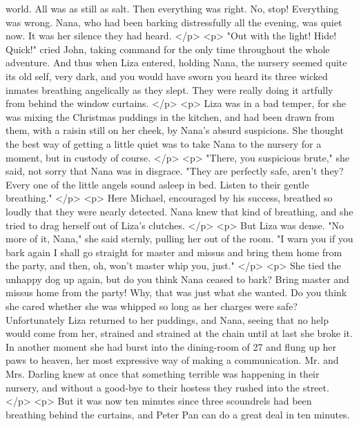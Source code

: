       world. All was as still as salt. Then everything was right. No, stop!
      Everything was wrong. Nana, who had been barking distressfully all the
      evening, was quiet now. It was her silence they had heard.
    </p>
    <p>
      "Out with the light! Hide! Quick!" cried John, taking command for the only
      time throughout the whole adventure. And thus when Liza entered, holding
      Nana, the nursery seemed quite its old self, very dark, and you would have
      sworn you heard its three wicked inmates breathing angelically as they
      slept. They were really doing it artfully from behind the window curtains.
    </p>
    <p>
      Liza was in a bad temper, for she was mixing the Christmas puddings in the
      kitchen, and had been drawn from them, with a raisin still on her cheek,
      by Nana's absurd suspicions. She thought the best way of getting a little
      quiet was to take Nana to the nursery for a moment, but in custody of
      course.
    </p>
    <p>
      "There, you suspicious brute," she said, not sorry that Nana was in
      disgrace. "They are perfectly safe, aren't they? Every one of the little
      angels sound asleep in bed. Listen to their gentle breathing."
    </p>
    <p>
      Here Michael, encouraged by his success, breathed so loudly that they were
      nearly detected. Nana knew that kind of breathing, and she tried to drag
      herself out of Liza's clutches.
    </p>
    <p>
      But Liza was dense. "No more of it, Nana," she said sternly, pulling her
      out of the room. "I warn you if you bark again I shall go straight for
      master and missus and bring them home from the party, and then, oh, won't
      master whip you, just."
    </p>
    <p>
      She tied the unhappy dog up again, but do you think Nana ceased to bark?
      Bring master and missus home from the party! Why, that was just what she
      wanted. Do you think she cared whether she was whipped so long as her
      charges were safe? Unfortunately Liza returned to her puddings, and Nana,
      seeing that no help would come from her, strained and strained at the
      chain until at last she broke it. In another moment she had burst into the
      dining-room of 27 and flung up her paws to heaven, her most expressive way
      of making a communication. Mr. and Mrs. Darling knew at once that
      something terrible was happening in their nursery, and without a good-bye
      to their hostess they rushed into the street.
    </p>
    <p>
      But it was now ten minutes since three scoundrels had been breathing
      behind the curtains, and Peter Pan can do a great deal in ten minutes.
